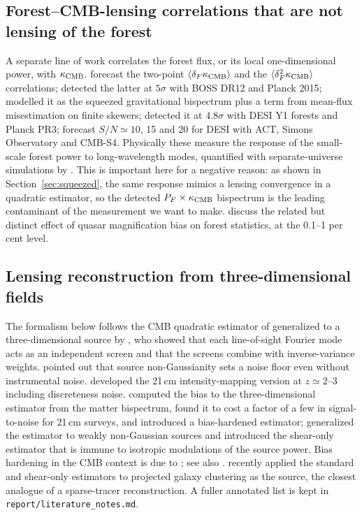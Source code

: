 \documentclass[11pt,a4paper]{article}
\newcommand{\dF}{\delta_F}
\newcommand{\kcmb}{\kappa_{\rm CMB}}
\begin{document}
\subsection{Forest--CMB-lensing correlations that are not lensing of the forest}

A separate line of work correlates the forest flux, or its local one-dimensional power, with $\kcmb$. \citet{0903.4171,0910.4125} forecast the two-point $\langle\dF\kcmb\rangle$ and the $\langle\dF^2\kcmb\rangle$ correlations; \citet{1607.03625} detected the latter at $5\sigma$ with BOSS DR12 and Planck 2015; \citet{1708.07512} modelled it as the squeezed gravitational bispectrum plus a term from mean-flux misestimation on finite skewers; \citet{2405.14988} detected it at $4.8\sigma$ with DESI Y1 forests and Planck PR3; \citet{2405.01628} forecast $S/N\simeq10$, 15 and 20 for DESI with ACT, Simons Observatory and CMB-S4. Physically these measure the response of the small-scale forest power to long-wavelength modes, quantified with separate-universe simulations by \citet{1701.03375}. This is important here for a negative reason: as shown in Section~\ref{sec:squeezed}, the same response mimics a lensing convergence in a quadratic estimator, so the detected $P_F\times\kcmb$ bispectrum is the leading contaminant of the measurement we want to make. \citet{1004.1165} discuss the related but distinct effect of quasar magnification bias on forest statistics, at the 0.1--1 per cent level.

\subsection{Lensing reconstruction from three-dimensional fields}

The formalism below follows the CMB quadratic estimator of \citet{astro-ph/0105424,astro-ph/0111606} generalized to a three-dimensional source by \citet{astro-ph/0511547}, who showed that each line-of-sight Fourier mode acts as an independent screen and that the screens combine with inverse-variance weights. \citet{0710.1108} pointed out that source non-Gaussianity sets a noise floor even without instrumental noise. \citet{1311.4484,1410.2533} developed the 21\,cm intensity-mapping version at $z\simeq2$--3 including discreteness noise. \citet{1803.04975} computed the bias to the three-dimensional estimator from the matter bispectrum, found it to cost a factor of a few in signal-to-noise for 21\,cm surveys, and introduced a bias-hardened estimator; \citet{1802.05706,1804.06403} generalized the estimator to weakly non-Gaussian sources and introduced the shear-only estimator that is immune to isotropic modulations of the source power. Bias hardening in the CMB context is due to \citet{1209.0091}; see also \citet{2007.04325,2101.12193}. \citet{2402.07988} recently applied the standard and shear-only estimators to projected galaxy clustering as the source, the closest analogue of a sparse-tracer reconstruction. A fuller annotated list is kept in \texttt{report/literature\_notes.md}.
\end{document}
